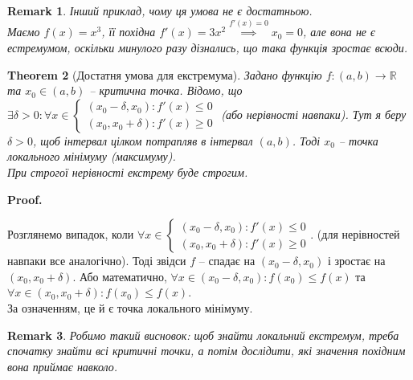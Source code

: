 \documentclass[a4paper, 14pt]{article}
\makeatletter
\def\qed{$\blacksquare$}
\theoremstyle{theoremdd}
\newtheorem{theorem}{Theorem}[subsection]
\theoremstyle{theoremdd}
\theoremstyle{theoremdd}
\theoremstyle{theoremdd}
\theoremstyle{theoremdd}
\theoremstyle{theoremdd}
\newtheorem{remark}[theorem]{Remark}
\theoremstyle{theoremdd}
\theoremstyle{theoremdd}
\renewenvironment{proof}[1][Proof.\\]{\par
\pushQED{\hfill \qed}%
\normalfont \topsep6\p@\@plus6\p@\relax
\trivlist
\item\relax
{\bfseries
#1\@addpunct{.}}\hspace\labelsep\ignorespaces
}{%
\popQED\endtrivlist\@endpefalse
}
\makeatother
\begin{document}
\begin{remark}
Інший приклад, чому ця умова не є достатньою.\\
Маємо $f(x) = x^3$, її похідна $f'(x) = 3x^2 \overset{f'(x) = 0}{\implies} x_0 = 0$, але вона не є естремумом, оскільки минулого разу дізнались, що така функція зростає всюди.
\end{remark}

\begin{theorem}[Достатня умова для екстремума]
Задано функцію $f \colon (a,b) \to \mathbb{R}$ та $x_0 \in (a,b)$ -- критична точка. Відомо, що $\exists \delta > 0: \forall x \in \begin{cases} (x_0-\delta,x_0): f'(x) \leq 0 \\ (x_0,x_0+\delta): f'(x) \geq 0 \end{cases}$ (або нерівності навпаки). Тут я беру $\delta >0$, щоб інтервал цілком потрапляв в інтервал $(a,b)$. Тоді $x_0$ -- точка локального мінімуму (максимуму).\\
При строгої нерівності екстрему буде строгим.
\end{theorem}

\begin{proof}
Розглянемо випадок, коли $\forall x \in \begin{cases} (x_0-\delta,x_0): f'(x) \leq 0 \\ (x_0,x_0+\delta): f'(x) \geq 0 \end{cases}$. (для нерівностей навпаки все аналогічно). Тоді звідси $f$ -- спадає на $(x_0 - \delta, x_0)$ і зростає на $(x_0, x_0 + \delta)$. Або математично, $\forall x \in (x_0-\delta, x_0): f(x_0) \leq f(x)$ та $\forall x \in (x_0, x_0+\delta): f(x_0) \leq f(x)$.\\
За означенням, це й є точка локального мінімуму.
\end{proof}

\begin{remark}
Робимо такий висновок: щоб знайти локальний екстремум, треба спочатку знайти всі критичні точки, а потім дослідити, які значення похідним вона приймає навколо.
\end{remark}
\end{document}
